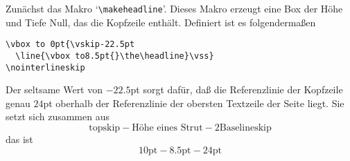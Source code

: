 Zun\"achst das Makro `\verb|\makeheadline|'. Dieses Makro erzeugt eine
Box der H\"ohe und Tiefe Null, das die 
Kopfzeile enth\"alt. Definiert ist
es folgenderma\ss{}en
\begin{verbatim}
\vbox to 0pt{\vskip-22.5pt
  \line{\vbox to8.5pt{}\the\headline}\vss}
\nointerlineskip
\end{verbatim}
Der seltsame Wert von $-22.5$pt sorgt daf\"ur, da\ss{} die
Referenzlinie der
Kopfzeile genau $24$pt oberhalb der Referenzlinie der obersten
Textzeile der Seite liegt. Sie setzt sich zusammen aus
$$\mbox{topskip} - \mbox{H\"ohe eines Strut} -
2\mbox{Baselineskip}$$
das ist
$$10\mbox{pt}-8.5\mbox{pt}-24\mbox{pt}$$

